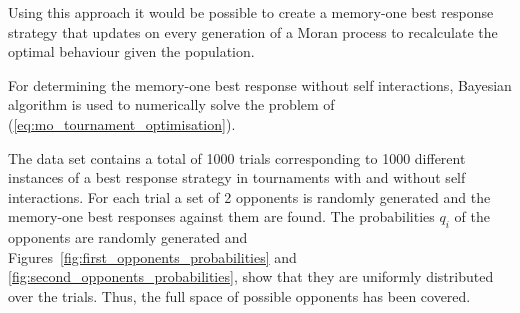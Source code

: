 Using this approach it would be possible to create a memory-one best response
strategy that updates on every generation of a Moran process to recalculate the
optimal behaviour given the population.

For determining the memory-one best response without self interactions,
Bayesian algorithm is used to numerically solve the problem of
(\ref{eq:mo_tournament_optimisation}).

The data set contains
a total of 1000 trials corresponding to 1000 different instances of a best
response strategy in tournaments with and without self interactions. For each
trial a set of 2 opponents is randomly generated and the memory-one best
responses against them are found. The probabilities \(q_i\) of the opponents are
randomly generated and Figures~\ref{fig:first_opponents_probabilities} and
\ref{fig:second_opponents_probabilities}, show that they are uniformly
distributed over the trials. Thus, the full space of possible opponents has been
covered.

